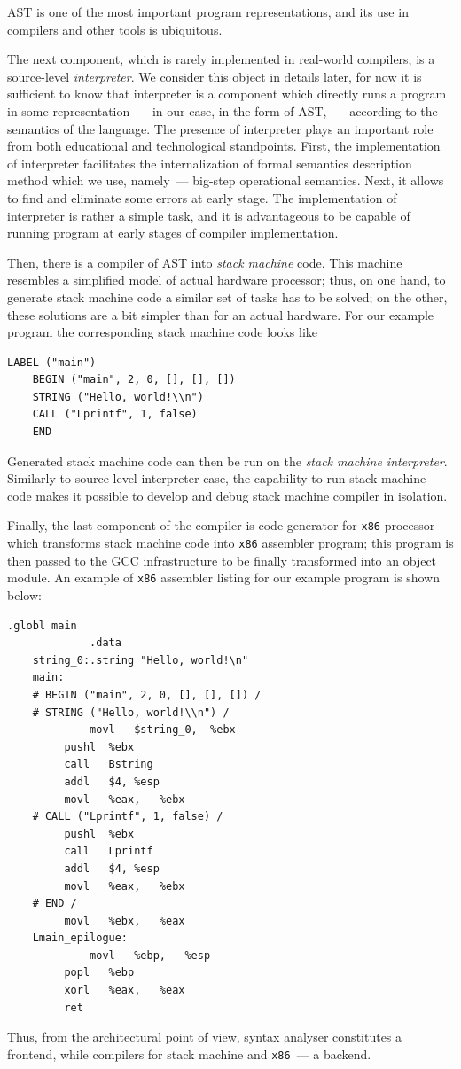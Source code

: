 AST is one of the most important program representations, and its use in compilers and other
tools is ubiquitous.

The next component, which is rarely implemented in real-world compilers, is a source-level \emph{interpreter}. We
consider this object in details later, for now it is sufficient to know that interpreter is a component which
directly runs a program in some representation~--- in our case, in the form of AST,~--- according to the semantics of the language.
The presence of interpreter plays an important role from both educational and technological standpoints. First,
the implementation of interpreter facilitates the internalization of formal semantics description method which
we use, namely~--- big-step operational semantics. Next, it allows to find and eliminate some errors
at early stage. The implementation of interpreter is rather a simple task, and it is advantageous to be capable of running program
at early stages of compiler implementation.

Then, there is a compiler of AST into \emph{stack machine} code. This machine resembles a simplified model of
actual hardware processor; thus, on one hand, to generate stack machine code a similar set of tasks has to be
solved; on the other, these solutions are a bit simpler than for an actual hardware. For our example
program the corresponding stack machine code looks like

\begin{lstlisting}[language=plain,basicstyle=\small]
    LABEL ("main")
    BEGIN ("main", 2, 0, [], [], [])
    STRING ("Hello, world!\\n")
    CALL ("Lprintf", 1, false)
    END
\end{lstlisting}

Generated stack machine code can then be run on the \emph{stack machine interpreter}. Similarly to source-level
interpreter case, the capability to run stack machine code makes it possible to develop and debug stack
machine compiler in isolation.

Finally, the last component of the compiler is code generator for \texttt{x86} processor which
transforms stack machine code into \texttt{x86} assembler program; this program is then passed to
the \textsc{GCC} infrastructure to be finally transformed into an object module. An example of
\texttt{x86} assembler listing for our example program is shown below:

\begin{lstlisting}[language=plain,basicstyle=\small]
             .globl	main
             .data
    string_0:.string "Hello, world!\n"
    main:
    # BEGIN ("main", 2, 0, [], [], []) /
    # STRING ("Hello, world!\\n") /
             movl	$string_0,	%ebx
	     pushl	%ebx
	     call	Bstring
	     addl	$4,	%esp
	     movl	%eax,	%ebx
    # CALL ("Lprintf", 1, false) /
	     pushl	%ebx
	     call	Lprintf
	     addl	$4,	%esp
	     movl	%eax,	%ebx
    # END /
	     movl	%ebx,	%eax
    Lmain_epilogue:
             movl	%ebp,	%esp
	     popl	%ebp
	     xorl	%eax,	%eax
	     ret
\end{lstlisting}

Thus, from the architectural point of view, syntax analyser constitutes a frontend, while compilers for
stack machine and \texttt{x86}~--- a backend.


